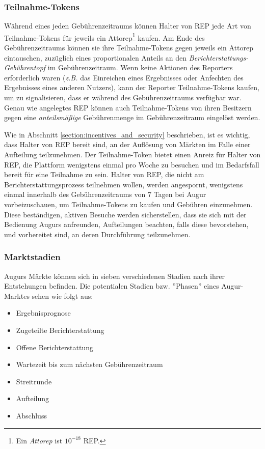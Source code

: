 \documentclass[floatfix,reprint,nofootinbib,amsmath,amssymb,epsfig,pre,floats,letterpaper,groupedaffiliation]{revtex4-1}
\theoremstyle{definition}
\theoremstyle{definition}
\theoremstyle{definition}
\begin{document}
\subsubsection{Teilnahme-Tokens}

Während eines jeden Gebührenzeitraums können Halter von REP jede Art von Teilnahme-Tokens für jeweils ein Attorep\footnote{Ein \textit{Attorep} ist $10^{-18}$ REP.} kaufen. Am Ende des Gebührenzeitraums können sie ihre Teilnahme-Tokens gegen jeweils ein Attorep eintauschen, zuzüglich eines proportionalen Anteils an den \textit{Berichterstattungs-Gebührentopf} im Gebührenzeitraum. Wenn keine Aktionen des Reporters erforderlich waren (\textit{z.B.} das Einreichen eines Ergebnisses oder Anfechten des Ergebnisses eines anderen Nutzers), kann der Reporter Teilnahme-Tokens kaufen, um zu signalisieren, dass er während des Gebührenzeitraums verfügbar war. Genau wie angelegtes REP können auch Teilnahme-Tokens von ihren Besitzern gegen eine \textit{anteilsmäßige} Gebührenmenge im Gebührenzeitraum eingelöst werden.

Wie in Abschnitt \ref{section:incentives_and_security} beschrieben, ist es wichtig, dass Halter von REP bereit sind, an der Auflösung von Märkten im Falle einer Aufteilung teilzunehmen. Der Teilnahme-Token bietet einen Anreiz für Halter von REP, die Plattform wenigstens einmal pro Woche zu besuchen und im Bedarfsfall bereit für eine Teilnahme zu sein. Halter von REP, die nicht am Berichterstattungsprozess teilnehmen wollen, werden angespornt, wenigstens einmal innerhalb des Gebührenzeitraums von 7 Tagen bei Augur vorbeizuschauen, um Teilnahme-Tokens zu kaufen und Gebühren einzunehmen. Diese beständigen, aktiven Besuche werden sicherstellen, dass sie sich mit der Bedienung Augurs anfreunden, Aufteilungen beachten, falls diese bevorstehen, und vorbereitet sind, an deren Durchführung teilzunehmen.

\subsubsection{Marktstadien}

Augurs Märkte können sich in sieben verschiedenen Stadien nach ihrer Entstehungen befinden. Die potentialen Stadien bzw. ''Phasen'' eines Augur-Marktes sehen wie folgt aus:
\begin{itemize}
\item Ergebnisprognose
\item Zugeteilte Berichterstattung
\item Offene Berichterstattung
\item Wartezeit bis zum nächsten Gebührenzeitraum
\item Streitrunde
\item Aufteilung
\item Abschluss
\end{itemize}
\end{document}
